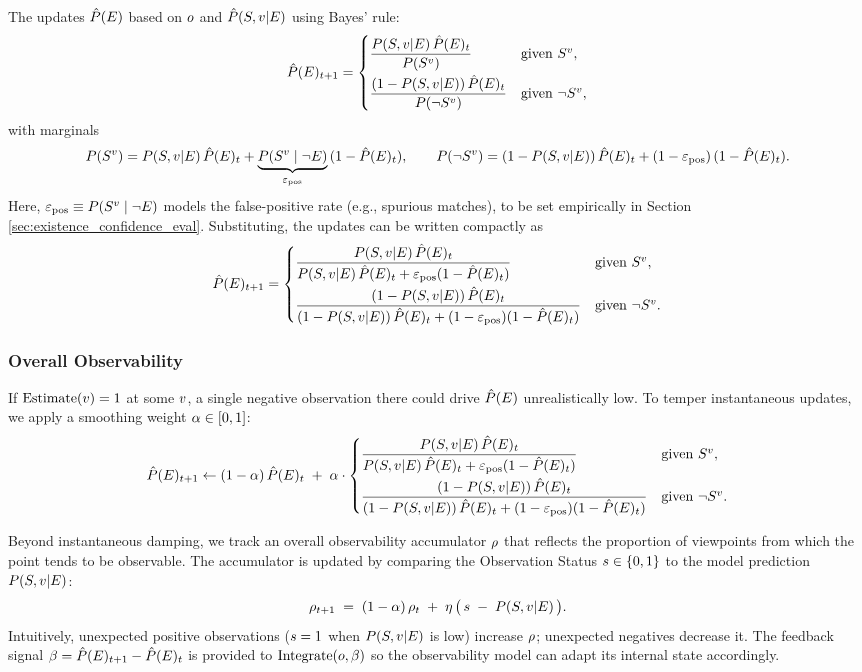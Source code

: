 The \epe{} updates \(\hat{P}(E)\) based on \(o\) and \(\hat{P}(S,v|E)\) using Bayes’ rule:
\[
    \hat{P}(E)_{t+1} =
    \begin{cases}
        \displaystyle \frac{P(S,v|E)\,\hat{P}(E)_t}{P(S^{v})} & \text{given } S^{v}, \\[8pt]
        \displaystyle \frac{(1-P(S,v|E))\,\hat{P}(E)_t}{P(\neg S^{v})} & \text{given } \neg S^{v},
    \end{cases}
\]
with marginals
\[
    P(S^{v}) = P(S,v|E)\,\hat{P}(E)_t + \underbrace{P(S^{v}\mid \lnot E)}_{\varepsilon_{\text{pos}}}\,(1-\hat{P}(E)_t), \qquad
    P(\neg S^{v}) = (1-P(S,v|E))\,\hat{P}(E)_t + (1-\varepsilon_{\text{pos}})\,(1-\hat{P}(E)_t).
\]
Here, \(\varepsilon_{\text{pos}} \equiv P(S^{v}\mid \lnot E)\) models the false-positive rate (e.g., spurious matches), to be set empirically in Section \ref{sec:existence_confidence_eval}. Substituting, the updates can be written compactly as
\[
    \hat{P}(E)_{t+1} =
    \begin{cases}
        \displaystyle \frac{P(S,v|E)\,\hat{P}(E)_t}{P(S,v|E)\,\hat{P}(E)_t + \varepsilon_{\text{pos}}(1-\hat{P}(E)_t)} & \text{given } S^{v}, \\[10pt]
        \displaystyle \frac{(1-P(S,v|E))\,\hat{P}(E)_t}{(1-P(S,v|E))\,\hat{P}(E)_t + (1-\varepsilon_{\text{pos}})(1-\hat{P}(E)_t)} & \text{given } \neg S^{v}.
    \end{cases}
\]

\subsubsection{Overall Observability}

If \(\operatorname{Estimate}(v)=1\) at some \(v\), a single negative observation there could drive \(\hat{P}(E)\) unrealistically low. To temper instantaneous updates, we apply a smoothing weight \(\alpha \in [0,1]\):
\[
    \hat{P}(E)_{t+1} \leftarrow (1-\alpha)\,\hat{P}(E)_t \;+\; \alpha \cdot
    \begin{cases}
        \displaystyle \frac{P(S,v|E)\,\hat{P}(E)_t}{P(S,v|E)\,\hat{P}(E)_t + \varepsilon_{\text{pos}}(1-\hat{P}(E)_t)} & \text{given } S^{v}, \\[10pt]
        \displaystyle \frac{(1-P(S,v|E))\,\hat{P}(E)_t}{(1-P(S,v|E))\,\hat{P}(E)_t + (1-\varepsilon_{\text{pos}})(1-\hat{P}(E)_t)} & \text{given } \neg S^{v}.
    \end{cases}
\]

Beyond instantaneous damping, we track an overall observability accumulator \(\rho\) that reflects the proportion of viewpoints from which the point tends to be observable. The accumulator is updated by comparing the Observation Status \(s\in\{0,1\}\) to the model prediction \(P(S,v|E)\):
\[
    \rho_{t+1} \;=\; (1-\alpha)\,\rho_t \;+\; \eta \,\big(\,s \;-\; P(S,v|E)\,\big).
\]
Intuitively, unexpected positive observations (\(s=1\) when \(P(S,v|E)\) is low) increase \(\rho\); unexpected negatives decrease it. The feedback signal \(\beta=\hat{P}(E)_{t+1}-\hat{P}(E)_t\) is provided to \(\operatorname{Integrate}(o,\beta)\) so the observability model can adapt its internal state accordingly.
